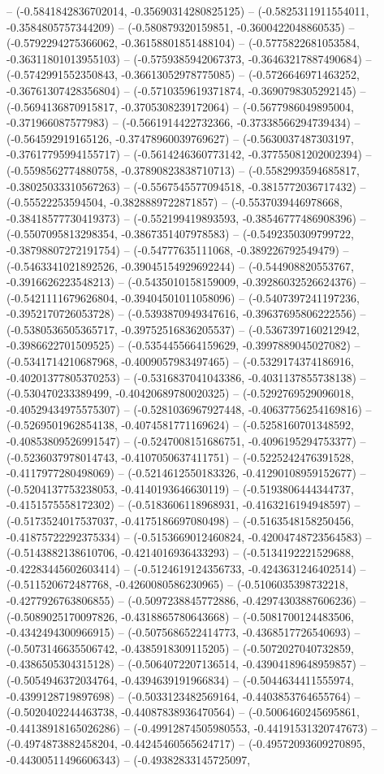 -- (-0.5841842836702014, -0.35690314280825125) -- (-0.5825311911554011, -0.3584805757344209) -- (-0.580879320159851, -0.3600422048860535) -- (-0.5792294275366062, -0.36158801851488104) -- (-0.5775822681053584, -0.36311801013955103) -- (-0.5759385942067373, -0.36463217887490684) -- (-0.5742991552350843, -0.36613052978775085) -- (-0.5726646971463252, -0.36761307428356804) -- (-0.5710359619371874, -0.3690798305292145) -- (-0.5694136870915817, -0.3705308239172064) -- (-0.5677986049895004, -0.371966087577983) -- (-0.5661914422732366, -0.37338566294739434) -- (-0.564592919165126, -0.37478960039769627) -- (-0.5630037487303197, -0.37617795994155717) -- (-0.5614246360773142, -0.37755081202002394) -- (-0.5598562774880758, -0.37890823838710713) -- (-0.5582993594685817, -0.38025033310567263) -- (-0.5567545577094518, -0.3815772036717432) -- (-0.55522253594504, -0.3828889722871857) -- (-0.5537039446978668, -0.38418577730419373) -- (-0.552199419893593, -0.38546777486908396) -- (-0.5507095813298354, -0.3867351407978583) -- (-0.5492350309799722, -0.38798807272191754) -- (-0.54777635111068, -0.389226792549479) -- (-0.5463341021892526, -0.39045154929692244) -- (-0.544908820553767, -0.3916626223548213) -- (-0.5435010158159009, -0.39286032526624376) -- (-0.5421111679626804, -0.39404501011058096) -- (-0.5407397241197236, -0.3952170726053728) -- (-0.5393870949347616, -0.39637695806222556) -- (-0.5380536505365717, -0.39752516836205537) -- (-0.5367397160212942, -0.3986622701509525) -- (-0.5354455664159629, -0.3997889045027082) -- (-0.5341714210687968, -0.4009057983497465) -- (-0.5329174374186916, -0.40201377805370253) -- (-0.5316837041043386, -0.4031137855738138) -- (-0.530470233389499, -0.40420689780020325) -- (-0.5292769529096018, -0.40529434975575307) -- (-0.5281036967927448, -0.40637756254169816) -- (-0.5269501962854138, -0.4074581771169624) -- (-0.5258160701348592, -0.40853809526991547) -- (-0.5247008151686751, -0.4096195294753377) -- (-0.5236037978014743, -0.4107050637411751) -- (-0.5225242476391528, -0.4117977280498069) -- (-0.5214612550183326, -0.41290108959152677) -- (-0.5204137753238053, -0.4140193646630119) -- (-0.5193806444344737, -0.4151575558172302) -- (-0.5183606118968931, -0.4163216194948597) -- (-0.5173524017537037, -0.4175186697080498) -- (-0.5163548158250456, -0.41875722292375334) -- (-0.5153669012460824, -0.42004748723564583) -- (-0.5143882138610706, -0.4214016936433293) -- (-0.5134192221529688, -0.42283445602603414) -- (-0.5124619124356733, -0.4243631246402514) -- (-0.511520672487768, -0.4260080586230965) -- (-0.5106035398732218, -0.4277926763806855) -- (-0.5097238845772886, -0.42974303887606236) -- (-0.5089025170097826, -0.4318865780643668) -- (-0.5081700124483506, -0.4342494300966915) -- (-0.5075686522414773, -0.4368517726540693) -- (-0.5073146635506742, -0.4385918309115205) -- (-0.5072027040732859, -0.4386505304315128) -- (-0.5064072207136514, -0.43904189648959857) -- (-0.5054946372034764, -0.4394639191966834) -- (-0.5044634411555974, -0.4399128719897698) -- (-0.5033123482569164, -0.4403853764655764) -- (-0.5020402244463738, -0.44087838936470564) -- (-0.5006460245695861, -0.44138918165026286) -- (-0.49912874505980553, -0.44191531320747673) -- (-0.4974873882458204, -0.44245460565624717) -- (-0.49572093609270895, -0.44300511496606343) -- (-0.49382833145725097, 